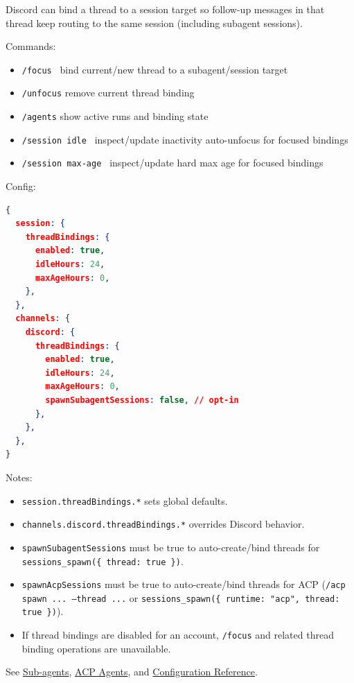 Discord can bind a thread to a session target so follow-up messages in that thread keep routing to the same session (including subagent sessions).

Commands:

\begin{itemize}
  \item \texttt{/focus } bind current/new thread to a subagent/session target
  \item \texttt{/unfocus} remove current thread binding
  \item \texttt{/agents} show active runs and binding state
  \item \texttt{/session idle } inspect/update inactivity auto-unfocus for focused bindings
  \item \texttt{/session max-age } inspect/update hard max age for focused bindings
\end{itemize}


Config:

\begin{lstlisting}[language=json]
{
  session: {
    threadBindings: {
      enabled: true,
      idleHours: 24,
      maxAgeHours: 0,
    },
  },
  channels: {
    discord: {
      threadBindings: {
        enabled: true,
        idleHours: 24,
        maxAgeHours: 0,
        spawnSubagentSessions: false, // opt-in
      },
    },
  },
}
\end{lstlisting}


Notes:

\begin{itemize}
  \item \texttt{session.threadBindings.*} sets global defaults.
  \item \texttt{channels.discord.threadBindings.*} overrides Discord behavior.
  \item \texttt{spawnSubagentSessions} must be true to auto-create/bind threads for \texttt{sessions\_spawn(\{ thread: true \})}.
  \item \texttt{spawnAcpSessions} must be true to auto-create/bind threads for ACP (\texttt{/acp spawn ... --thread ...} or \texttt{sessions\_spawn(\{ runtime: "acp", thread: true \})}).
  \item If thread bindings are disabled for an account, \texttt{/focus} and related thread binding operations are unavailable.
\end{itemize}


See \href{/tools/subagents}{Sub-agents}, \href{/tools/acp-agents}{ACP Agents}, and \href{/gateway/configuration-reference}{Configuration Reference}.


